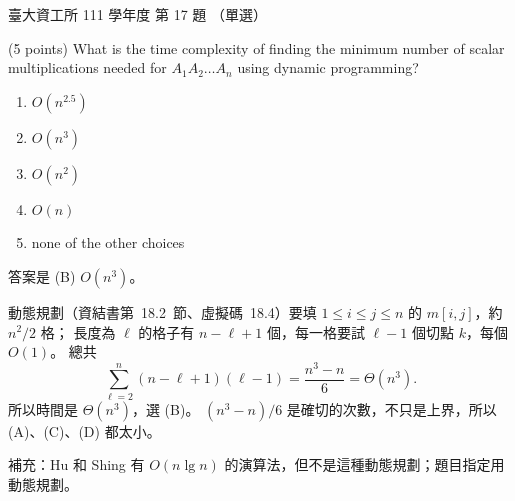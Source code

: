 \begin{pastexam}[label={px:ntu-111-dsaa-17}]{臺大資工所 111 學年度 第 17 題}
（單選）

(5 points) What is the time complexity of finding the minimum number of scalar multiplications
needed for $A_1A_2\ldots A_n$ using dynamic programming?
\begin{enumerate}[label=(\Alph*)]
\item $O(n^{2.5})$
\item $O(n^3)$
\item $O(n^2)$
\item $O(n)$
\item none of the other choices
\end{enumerate}
\end{pastexam}

\begin{pastsoln}
答案是 (B) $O(n^3)$。

動態規劃（資結書第~18.2~節、虛擬碼~18.4）要填 $1 \le i \le j \le n$ 的 $m[i, j]$，約 $n^2/2$ 格；
長度為 $\ell$ 的格子有 $n - \ell + 1$ 個，每一格要試 $\ell - 1$ 個切點 $k$，每個 $O(1)$。 總共
\[
\sum_{\ell=2}^{n} (n - \ell + 1)(\ell - 1) = \frac{n^3 - n}{6} = \Theta(n^3).
\]
所以時間是 $\Theta(n^3)$，選 (B)。 $(n^3 - n)/6$ 是確切的次數，不只是上界，所以 (A)、(C)、(D) 都太小。

補充：Hu 和 Shing 有 $O(n \lg n)$ 的演算法，但不是這種動態規劃；題目指定用動態規劃。
\end{pastsoln}
